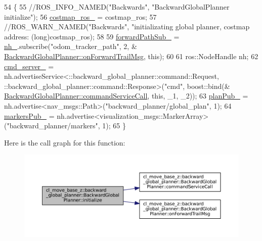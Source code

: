 \begin{DoxyCode}
54 \{
55     \textcolor{comment}{//ROS\_INFO\_NAMED("Backwards", "BackwardGlobalPlanner initialize");}
56     \hyperlink{classcl__move__base__z_1_1backward__global__planner_1_1BackwardGlobalPlanner_a7103c15e6540a514acd421c3c6e194a4}{costmap\_ros\_} = costmap\_ros;
57     \textcolor{comment}{//ROS\_WARN\_NAMED("Backwards", "initializating global planner, costmap address: %
       (long)costmap\_ros);}
58 
59     \hyperlink{classcl__move__base__z_1_1backward__global__planner_1_1BackwardGlobalPlanner_a27fbf960495d95b87cc50e8556c79d9f}{forwardPathSub\_} = \hyperlink{classcl__move__base__z_1_1backward__global__planner_1_1BackwardGlobalPlanner_adeb0df38d8dcde919b732724420a401f}{nh\_}.subscribe(\textcolor{stringliteral}{"odom\_tracker\_path"}, 2, &
      \hyperlink{classcl__move__base__z_1_1backward__global__planner_1_1BackwardGlobalPlanner_a515bde5bfb3ae548f3e19209df1a48b0}{BackwardGlobalPlanner::onForwardTrailMsg}, \textcolor{keyword}{this});
60 
61     ros::NodeHandle nh;
62     \hyperlink{classcl__move__base__z_1_1backward__global__planner_1_1BackwardGlobalPlanner_a77a63b85852ee58b5a142e1361bf984e}{cmd\_server\_} = nh.advertiseService<::backward\_global\_planner::command::Request, 
      ::backward\_global\_planner::command::Response>(\textcolor{stringliteral}{"cmd"}, boost::bind(&
      \hyperlink{classcl__move__base__z_1_1backward__global__planner_1_1BackwardGlobalPlanner_a399a3dd0a3f8c781be06158e3238a5d9}{BackwardGlobalPlanner::commandServiceCall}, \textcolor{keyword}{this}, \_1, \_2));
63     \hyperlink{classcl__move__base__z_1_1backward__global__planner_1_1BackwardGlobalPlanner_a561eab039140948c52ec928c191f3f43}{planPub\_} = nh.advertise<nav\_msgs::Path>(\textcolor{stringliteral}{"backward\_planner/global\_plan"}, 1);
64     \hyperlink{classcl__move__base__z_1_1backward__global__planner_1_1BackwardGlobalPlanner_a6f80f7041c8cdc93e1f3dfd0e723654a}{markersPub\_} = nh.advertise<visualization\_msgs::MarkerArray>(\textcolor{stringliteral}{"backward\_planner/markers"}, 1);
65 \}
\end{DoxyCode}
Here is the call graph for this function\+:
\nopagebreak
\begin{figure}[H]
\begin{center}
\leavevmode
\includegraphics[width=350pt]{classcl__move__base__z_1_1backward__global__planner_1_1BackwardGlobalPlanner_af17978c77ec96d4ecc26b3a6ba75e1e9_cgraph}
\end{center}
\end{figure}
